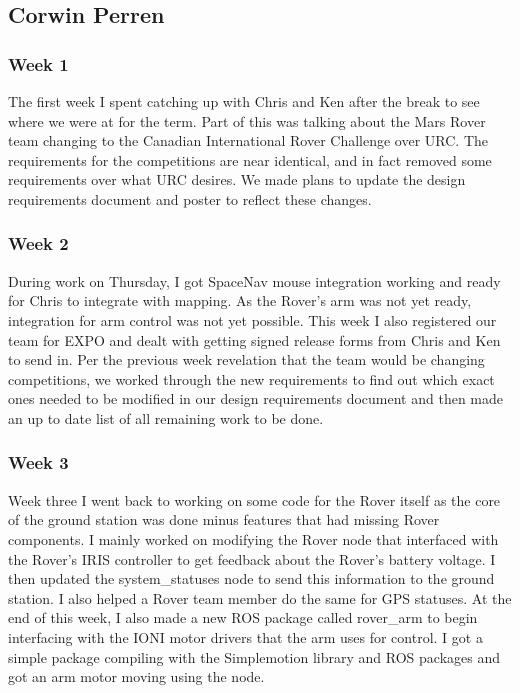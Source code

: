 \subsection{Corwin Perren}
\subsubsection{Week 1}
The first week I spent catching up with Chris and Ken after the break to see where we were at for the term. Part of this was talking about the Mars Rover team changing to the Canadian International Rover Challenge over URC. The requirements for the competitions are near identical, and in fact removed some requirements over what URC desires. We made plans to update the design requirements document and poster to reflect these changes.

\subsubsection{Week 2}
During work on Thursday, I got SpaceNav mouse integration working and ready for Chris to integrate with mapping. As the Rover's arm was not yet ready, integration for arm control was not yet possible. This week I also registered our team for EXPO and dealt with getting signed release forms from Chris and Ken to send in. Per the previous week revelation that the team would be changing competitions, we worked through the new requirements to find out which exact ones needed to be modified in our design requirements document and then made an up to date list of all remaining work to be done.

\subsubsection{Week 3}
Week three I went back to working on some code for the Rover itself as the core of the ground station was done minus features that had missing Rover components. I mainly worked on modifying the Rover node that interfaced with the Rover's IRIS controller to get feedback about the Rover's battery voltage. I then updated the system\_statuses node to send this information to the ground station. I also helped a Rover team member do the same for GPS statuses. At the end of this week, I also made a new ROS package called rover\_arm to begin interfacing with the IONI motor drivers that the arm uses for control. I got a simple package compiling with the Simplemotion library and ROS packages and got an arm motor moving using the node. 


